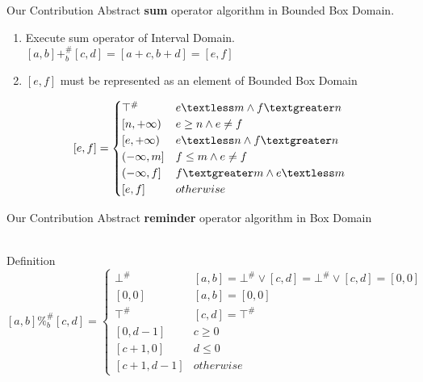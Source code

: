 \documentclass{beamer}
\begin{document}
	\begin{frame}{Our Contribution}
		Abstract \textbf{sum} operator algorithm in Bounded Box Domain.
		\begin{enumerate}
			\item Execute sum operator of Interval Domain. 
			$[a,b] +_{b}^\# [c,d] = [a + c,b + d] = [e,f]$
			\item $[e,f]$ must be represented as an element of Bounded Box Domain
		\end{enumerate}
	\[ [e,f] =
	\begin{cases} 
	\top^\# & e \textless m \land f \textgreater n\\
	[n,+\infty) & e \geq n  \land  e \neq f\\
	[e,+\infty) & e \textless n \land f \textgreater n\\
	(-\infty,m] & f \leq m \land e \neq f\\
	(-\infty,f] & f \textgreater m \land e \textless m \\
	[e,f] & otherwise
	\end{cases}
	\]
		
	\end{frame}
	\begin{frame}{Our Contribution}
	Abstract \textbf{reminder} operator algorithm in Box Domain\\~\\
		\begin{block}{Definition}
		\scriptsize	
		\[ [a,b] \%_{b}^\# [c,d] =
		\begin{cases}
		\bot^\# & [a,b] = \bot^\# \lor [c,d] = \bot^\# \lor [c,d] = [0,0] \\ 
		[0,0] & [a,b] = [0,0] \\
		\top^\# & [c,d] = \top^\# \\
		[0,d-1] & c \geq 0\\
		[c+1,0] & d \leq 0 \\
		[c+1,d-1] & otherwise
		\end{cases}
		\]
		\normalsize
	\end{block}
	
	\end{frame}
\end{document}
